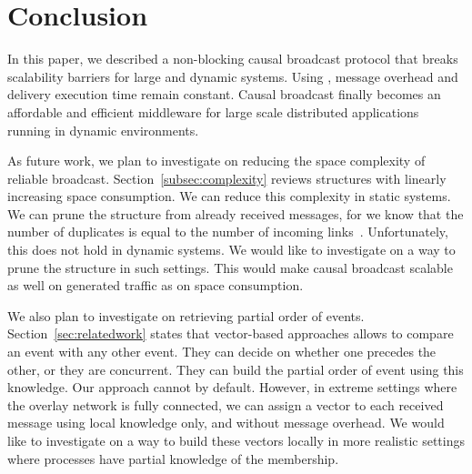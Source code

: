
\section{Conclusion}
\label{sec:conclusion}

In this paper, we described a non-blocking causal broadcast protocol that breaks
scalability barriers for large and dynamic systems. Using \CBROADCAST, message
overhead and delivery execution time remain constant.
Causal broadcast finally becomes an affordable and efficient middleware for
large scale distributed applications running in dynamic environments.

As future work, we plan to investigate on reducing the space complexity of
reliable broadcast. Section~\ref{subsec:complexity} reviews structures with
linearly increasing space consumption. We can reduce this complexity in static
systems. We can prune the structure from already received messages, for we know
that the number of duplicates is equal to the number of incoming
links~\cite{raynal2013distributed}. Unfortunately, this does not hold in dynamic
systems. We would like to investigate on a way to prune the structure in such
settings. This would make causal broadcast scalable as well on generated traffic
as on space consumption.

We also plan to investigate on retrieving partial order of
events. Section~\ref{sec:relatedwork} states that vector-based approaches allows
to compare an event with any other event. They can decide on whether one
precedes the other, or they are concurrent. They can build the partial order of
event using this knowledge. Our approach cannot by default. However, in extreme
settings where the overlay network is fully connected, we can assign a vector to
each received message using local knowledge only, and without message
overhead. We would like to investigate on a way to build these vectors locally
in more realistic settings where processes have partial knowledge of the
membership. %

